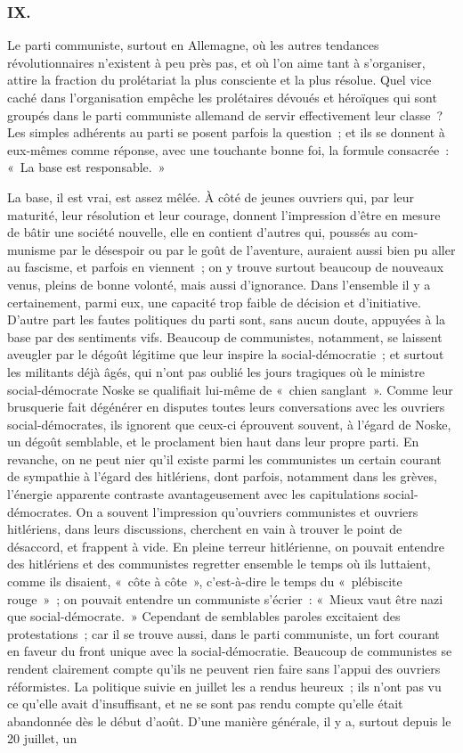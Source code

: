 \documentclass[french,twoside]{book} %
\begin{document}
\subsubsection[{IX.}]{IX.}
\noindent Le parti communiste, surtout en Allemagne, où les autres tendances révolutionnaires n'existent à peu près pas, et où l'on aime tant à s'organiser, attire la fraction du prolétariat la plus consciente et la plus résolue. Quel vice caché dans l'organisation empêche les prolétaires dévoués et héroïques qui sont groupés dans le parti communiste allemand de servir effectivement leur classe ? Les simples adhérents au parti se posent parfois la question ; et ils se donnent à eux-mêmes comme réponse, avec une touchante bonne foi, la formule consacrée : « La base est responsable. »\par
La base, il est vrai, est assez mêlée. À côté de jeunes ouvriers qui, par leur maturité, leur résolution et leur courage, donnent l'impression d'être en mesure de bâtir une société nouvelle, elle en contient d'autres qui, poussés au com­munisme par le désespoir ou par le goût de l'aventure, auraient aussi bien pu aller au fascisme, et parfois en viennent ; on y trouve surtout beaucoup de nou­veaux venus, pleins de bonne volonté, mais aussi d'ignorance. Dans l'ensemble il y a certainement, parmi eux, une capacité trop faible de décision et d'initiative. D'autre part les fautes politiques du parti sont, sans aucun doute, appuyées à la base par des sentiments vifs. Beaucoup de communistes, notamment, se laissent aveugler par le dégoût légitime que leur inspire la social-démocratie ; et surtout les militants déjà âgés, qui n'ont pas oublié les jours tragiques où le ministre social-démocrate Noske se qualifiait lui-même de « chien sanglant ». Comme leur brusquerie fait dégénérer en disputes toutes leurs conversations avec les ouvriers social-démocrates, ils ignorent que ceux-ci éprouvent souvent, à l'égard de Noske, un dégoût semblable, et le proclament bien haut dans leur propre parti. En revanche, on ne peut nier qu'il existe parmi les communistes un certain courant de sympathie à l'égard des hitlériens, dont parfois, notamment dans les grèves, l'énergie apparente con­traste avantageusement avec les capitulations social-démocrates. On a souvent l'impression qu'ouvriers communistes et ouvriers hitlériens, dans leurs discussions, cherchent en vain à trouver le point de désaccord, et frappent à vide. En pleine terreur hitlérienne, on pouvait entendre des hitlériens et des communistes regretter ensemble le temps où ils luttaient, comme ils disaient, « côte à côte », c'est-à-dire le temps du « plébiscite rouge » ; on pouvait enten­dre un communiste s'écrier : « Mieux vaut être nazi que social-démocrate. » Cependant de semblables paroles excitaient des protestations ; car il se trouve aussi, dans le parti communiste, un fort courant en faveur du front unique avec la social-démocratie. Beaucoup de communistes se rendent clairement compte qu'ils ne peuvent rien faire sans l'appui des ouvriers réformistes. La politique suivie en juillet les a rendus heureux ; ils n'ont pas vu ce qu'elle avait d'insuffisant, et ne se sont pas rendu compte qu'elle était abandonnée dès le début d'août. D'une manière générale, il y a, surtout depuis le 20 juillet, un 
\end{document}
